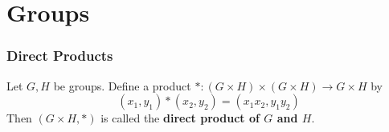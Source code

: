 \documentclass{book}
\begin{document}
	
	
	
	
	
	
	
	
	
	
	
	
	
	
	
	
	
	
	
	
	
	
	
	
	
	
	
	
	
	
	
	
	
	
	
	
	
	
	
	
	
	
	
	
	
	
	
	
	
	
	
	
	
	
	
	
	
	
	
	
	
	
	
	
	
	
	
	
	
	
	
	
	
	
	
	
	
	
	
	
	
	
	
	
	
	\newpage

	
	
	\chapter{Groups}
	
	\subsection{Direct Products}
	
	\begin{defn}
	Let $G,H$ be groups. Define a product $*:(G \times H) \times (G \times H) \rightarrow G \times H$ by 
	$$(x_1,y_1) * (x_2, y_2) = (x_1x_2, y_1y_2)$$
	Then $(G \times H, *)$ is called the \textbf{direct product of $G$ and $H$}.
	\end{defn}	
	
\end{document}
